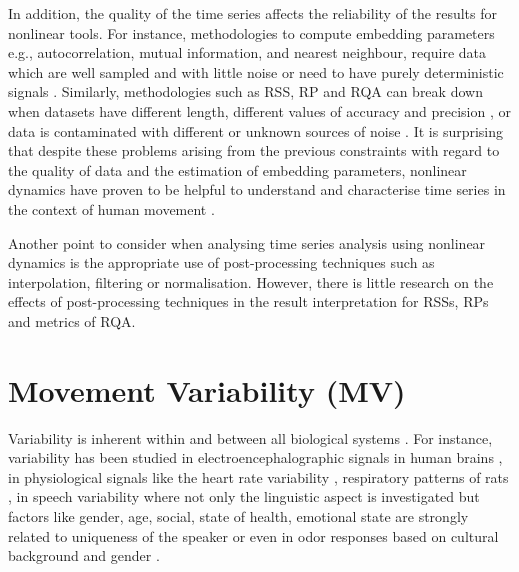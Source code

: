 In addition, the quality of the time series affects the reliability of the 
results for nonlinear tools. For instance, methodologies to compute embedding 
parameters e.g., autocorrelation, mutual information, and nearest neighbour,
require data which are well sampled and with little noise \citep{garland2016} 
or need to have purely deterministic signals \citep{kantz2003}.
Similarly, methodologies such as RSS, RP and RQA can break down when 
datasets have different length, different values of accuracy and 
precision \citep{frank2010},
or data is contaminated with different or unknown sources of noise 
\citep{garland2016}. It is surprising that despite these problems arising 
from the previous constraints with regard to the quality of data 
and the estimation of embedding parameters, nonlinear dynamics have proven 
to be helpful to understand and characterise time series in the context 
of human movement 
\citep{Quintana-Duque2012, Quintana-Duque2016, sama2013, frank2010,
gomezgarcia2014, marwan2011, stergiou2011, bradley2015}.

Another point to consider when analysing time series analysis using 
nonlinear dynamics is the appropriate use of post-processing techniques 
such as interpolation, filtering or normalisation.
However, there is little research on the effects of post-processing 
techniques in the result interpretation for  RSSs, RPs and metrics of RQA.

%






\section{Movement Variability (MV)}
Variability is inherent within and between all biological 
systems \citep{newell1993}.
For instance, variability has been studied in electroencephalographic 
signals in human brains \citep{klonowski2007}, in physiological signals 
like the heart rate variability \citep{schumacher2004, acharya2006}, 
respiratory patterns of rats \citep{dhingra2011}, in speech variability 
where not only the linguistic aspect is investigated but 
factors like gender, age, social, state of health, emotional state are
strongly related to uniqueness of the speaker \citep{benzeghiba2007}
or even in odor responses based on cultural background and 
gender \citep{ferdenzi2013}.

